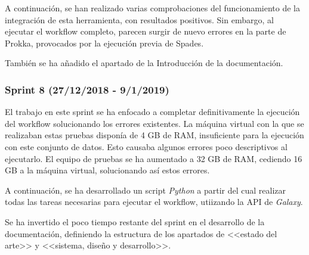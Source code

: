 A continuación, se han realizado varias comprobaciones del funcionamiento de la integración de esta herramienta, con resultados positivos. Sin embargo, al ejecutar el workflow completo, parecen surgir de nuevo errores en la parte de Prokka, provocados por la ejecución previa de Spades. 

También se ha añadido el apartado de la Introducción de la documentación.

\subsubsection{Sprint 8 (27/12/2018 - 9/1/2019)}
El trabajo en este sprint se ha enfocado a completar definitivamente la ejecución del workflow solucionando los errores existentes. La máquina virtual con la que se realizaban estas pruebas disponía de 4 GB de RAM, insuficiente para la ejecución con este conjunto de datos. Esto causaba algunos errores poco descriptivos al ejecutarlo. El equipo de pruebas se ha aumentado a 32 GB de RAM, cediendo 16 GB a la máquina virtual, solucionando así estos errores.

A continuación, se ha desarrollado un script \textit{Python} a partir del cual realizar todas las tareas necesarias para ejecutar el workflow, utiizando la API de \textit{Galaxy}.

Se ha invertido el poco tiempo restante del sprint en el desarrollo de la documentación, definiendo la estructura de los apartados de <<estado del arte>> y <<sistema, diseño y desarrollo>>.
\newpage \thispagestyle{empty} %